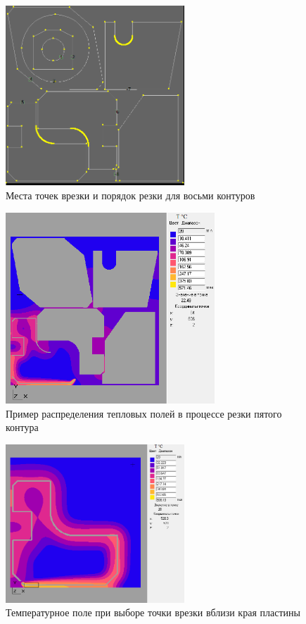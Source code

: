 \documentclass[11pt,twoside,openany]{report}
\begin{document}
\begin{figure}
  \centering
  \includegraphics[width=0.6\textwidth]{thermal-plan.png}
  \caption{Места точек врезки и порядок резки для восьми контуров}
  \label{thermal-plan}
\end{figure}

\begin{figure}
  \centering
  \includegraphics[width=0.7\textwidth]{thermal-5.png}
  \caption{Пример распределения тепловых полей в процессе резки пятого контура}
  \label{thermal-5}
\end{figure}

\begin{figure}
  \centering
  \includegraphics[width=0.6\textwidth]{thermal-high.png}
  \caption{Температурное поле при выборе точки врезки вблизи края пластины}
  \label{thrm-high}
\end{figure}
\end{document}
